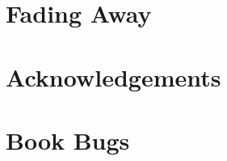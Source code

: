 \documentclass[a5paper,oneside]{scrbook}
\begin{document}
	


\begin{comment}

\tableofcontents

\chapter*{Preface\label{preface}}


\chapter{One Blinkenlight\label{ch1}}


\chapter{Speedy Blinkenlight\label{ch2}}


\chapter{Two Blinkenlights\label{ch3}}


\chapter*{Waiting for the World\label{medio1}}


\chapter{Push the Button\label{ch4}}


\chapter{Tick... tick... tick...\label{ch5a}}


\chapter{Undressing Toggle\label{ch5}}


\chapter{Buttons Everywhere\label{ch6}}


\end{comment}

\chapter{Fading Away\label{ch7}}


\chapter{Acknowledgements\label{acknowledgements}}


\chapter{Book Bugs\label{bugs}}

\end{document}
